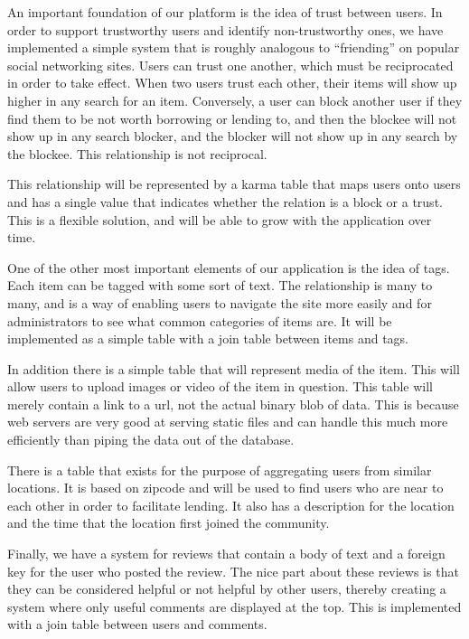 \documentclass{acm_proc_article-sp}
\begin{document}
An important foundation of our platform is the idea of trust between users. In order to support trustworthy users and identify non-trustworthy ones, we have implemented a simple system that is roughly analogous to ``friending'' on popular social networking sites. Users can trust one another, which must be reciprocated in order to take effect. When two users trust each other, their items will show up higher in any search for an item. Conversely, a user can block another user if they find them to be not worth borrowing or lending to, and then the blockee will not show up in any search blocker, and the blocker will not show up in any search by the blockee. This relationship is not reciprocal.

This relationship will be represented by a karma table that maps users onto users and has a single value that indicates whether the relation is a block or a trust. This is a flexible solution, and will be able to grow with the application over time.

One of the other most important elements of our application is the idea of tags. Each item can be tagged with some sort of text. The relationship is many to many, and is a way of enabling users to navigate the site more easily and for administrators to see what common categories of items are. It will be implemented as a simple table with a join table between items and tags.

In addition there is a simple table that will represent media of the item. This will allow users to upload images or video of the item in question. This table will merely contain a link to a url, not the actual binary blob of data. This is because web servers are very good at serving static files and can handle this much more efficiently than piping the data out of the database.

There is a table that exists for the purpose of aggregating users from similar locations. It is based on zipcode and will be used to find users who are near to each other in order to facilitate lending. It also has a description for the location and the time that the location first joined the community.

Finally, we have a system for reviews that contain a body of text and a foreign key for the user who posted the review. The nice part about these reviews is that they can be considered helpful or not helpful by other users, thereby creating a system where only useful comments are displayed at the top. This is implemented with a join table between users and comments.
\end{document}
